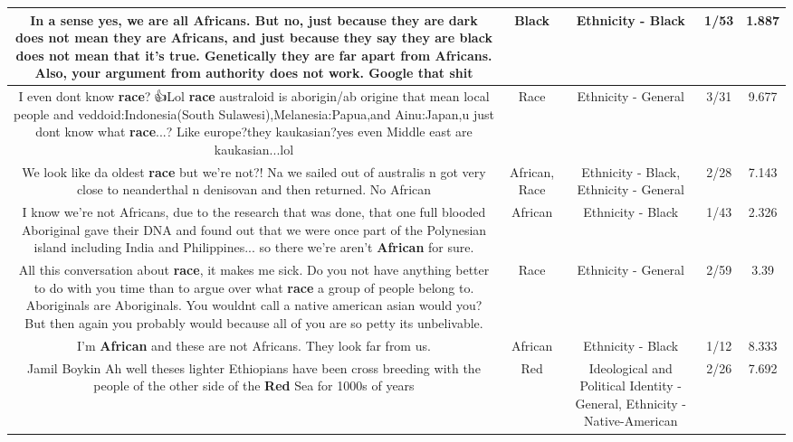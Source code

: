 \documentclass[11pt]{article}
\newlength\mylength
\begin{document}
\begin{center}
\begin{longtable}{|C{.65\mylength}|C{.30\mylength}|C{.12\mylength}|C{.12\mylength}|C{.12\mylength}|}
  \small In a sense yes, we are all Africans. But no, just because they are dark does not mean they are Africans, and just because they say they are \textbf{black} does not mean that it's true. Genetically they are far apart from Africans. Also, your argument from authority does not work. Google that shit\normalsize   & Black & Ethnicity - Black & 1/53 & 1.887 \\  \hline
  \small I even dont know \textbf{race}?🤣👍Lol \textbf{race} australoid is aborigin/ab origine that mean local people and veddoid:Indonesia(South Sulawesi),Melanesia:Papua,and Ainu:Japan,u just dont know what \textbf{race}...? Like europe?they kaukasian?yes even Middle east are kaukasian...lol\normalsize   & Race & Ethnicity - General & 3/31 & 9.677 \\  \hline
  \small We look like da oldest \textbf{race} but we're not?! Na we sailed out of australis n got very close to neanderthal n denisovan and then returned. No African\normalsize   & African, Race & Ethnicity - Black, Ethnicity - General & 2/28 & 7.143 \\  \hline
  \small I know we're not Africans, due to the research that was done, that one full blooded Aboriginal gave their DNA and found out that we were once part of the Polynesian island including India and Philippines... so there we're aren't \textbf{African} for sure.\normalsize   & African & Ethnicity - Black & 1/43 & 2.326 \\  \hline
  \small All this conversation about \textbf{race}, it makes me sick. Do you not have anything better to do with you time than to argue over what \textbf{race} a group of people belong to. Aboriginals are Aboriginals. You wouldnt call a native american asian would you? But then again you probably would because all of you are so petty its unbelivable.\normalsize   & Race & Ethnicity - General & 2/59 & 3.39 \\  \hline
  \small I'm \textbf{African} and these are not Africans. They look far from us.\normalsize   & African & Ethnicity - Black & 1/12 & 8.333 \\  \hline
  \small Jamil Boykin Ah well theses lighter Ethiopians have been cross breeding with the people of the other side of the \textbf{R\textbf{ed}} Sea for 1000s of years\normalsize   & Red &  Ideological and Political Identity - General, Ethnicity - Native-American & 2/26 & 7.692 \\  \hline
  

\end{longtable}
\end{center}
\end{document}
